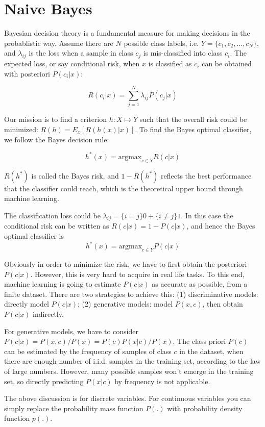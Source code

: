\section{Naive Bayes}

Bayesian decision theory is a fundamental measure for making decisions in the
probablistic way. Assume there are $N$ possible class labels, i.e.
$Y=\{c_1,c_2,\ldots,c_N\}$, and $\lambda_{ij}$ is the loss when a sample in
class $c_j$ is mis-classified into class $c_i$. The expected loss, or say
conditional risk, when $x$ is classified as $c_i$ can be obtained with
posteriori $P(c_i|x)$:

$$ R(c_i|x) = \sum_{j=1}^N \lambda_{ij} P(c_j|x) $$

Our mission is to find a criterion $h:X\mapsto Y$ such that the overall risk
could be minimized: $ R(h) = E_x [R(h(x)|x)] $. To find the Bayes optimal
classifier, we follow the Bayes decision rule:

$$ h^*(x) = \text{argmax}_{c\in Y} R(c|x)$$

$R(h^*)$ is called the Bayes risk, and $1-R(h^*)$ reflects the best performance
that the classifier could reach, which is the theoretical upper bound through
machine learning.

The classification loss could be $ \lambda_{ij} = \{i=j\}0 + \{i\ne j\}1 $.
In this case the conditional risk can be written as $ R(c|x) = 1-P(c|x)$,
and hence the Bayes optimal classifier is
$$ h^*(x) = \text{argmax}_{c\in Y} P(c|x) $$

Obviously in order to minimize the risk, we have to first obtain the posteriori
$P(c|x)$. However, this is very hard to acquire in real life tasks. To this
end, machine learning is going to estimate $P(c|x)$ as accurate as possible,
from a finite dataset. There are two strategies to achieve this: (1)
discriminative models: directly model $P(c|x)$; (2) generative models: model
$P(x,c)$, then obtain $P(c|x)$ indirectly.

For generative models, we have to consider $P(c|x) = P(x,c)/P(x) =
P(c)P(x|c)/P(x)$.  The class priori $P(c)$ can be estimated by the frequency of
samples of class $c$ in the dataset, when there are enough number of i.i.d.
samples in the training set, according to the law of large numbers. However,
many possible samples won't emerge in the training set, so directly predicting
$P(x|c)$ by frequency is not applicable.

The above discussion is for discrete variables. For continuous variables you
can simply replace the probability mass function $P(.)$ with probability
density function $p(.)$.

